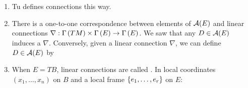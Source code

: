 \documentclass[main.tex]{subfiles}
\begin{document}
\begin{note}
    \begin{enumerate}
        \item Tu defines connections this way.
        \item There is a one-to-one correspondence between elements of $\mathcal{A}(E)$ and linear connections  $\nabla: \Gamma\left( TM \right) \times \Gamma\left( E \right) \to \Gamma\left( E \right)$. We saw that any $D \in \mathcal{A}(E)$ induces a $\nabla$. Conversely, given a linear connection $\nabla$, we can define $D \in \mathcal{A}(E)$ by 
        \item When $E = TB$, linear connections
        are called . In local coordinates $(x_1, \dots, x_n)$ on $B$ and a local frame $\left\{e_1, \dots, e_r\right\}$ on $E$: 
    \end{enumerate}
\end{note}
\end{document}
